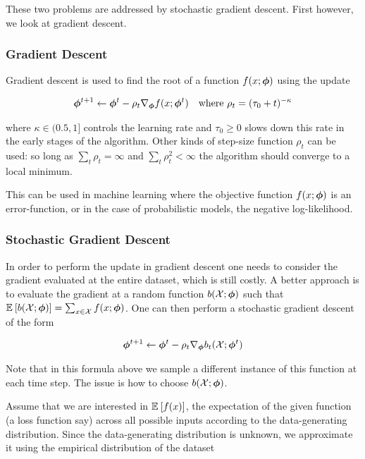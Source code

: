 These two problems are addressed by stochastic gradient descent. First however, we look at gradient descent.

\subsubsection*{Gradient Descent}
Gradient descent is used to find the root of a function $f(x; { \bm \phi })$ using the update

\begin{align*}
{  \bm \phi  }^{t+1} & \leftarrow {  \bm \phi  }^t - \rho_t \nabla_{ \bm \phi } f(x; { \bm \phi }^t) &
\text{where } \rho_t = (\tau_0 + t)^{-\kappa}
\end{align*}

where $\kappa \in (0.5,1]$ controls the learning rate and $\tau_0 \geq 0$ slows down this rate in the early stages of the algorithm. Other kinds of step-size function $\rho_t$ can be used: so long as $\sum_t \rho_t = \infty$ and $\sum_t \rho^2_t < \infty$ the algorithm should converge to a local minimum\cite{RobbinsMonro1951}. 

This can be used in machine learning where the objective function $f(x; { \bm \phi })$ is an error-function, or in the case of probabilistic models, the negative log-likelihood.

\subsubsection*{Stochastic Gradient Descent}
In order to perform the update in gradient descent one needs to consider the gradient evaluated at the entire dataset, which is still costly. A better approach is to evaluate the gradient at a random function $b({ \mathcal{X} }; { \bm \phi })$ such that $\mathbb{E}_{ {  } }\left[ b({ \mathcal{X} }; { \bm \phi }) \right] = \sum_{x \in { \mathcal{X} }} f(x; { \bm \phi })$. One can then perform a stochastic gradient descent of the form

\begin{align*}
{  \bm \phi  }^{t+1} \leftarrow {  \bm \phi  }^t - \rho_t \nabla_{ \bm \phi } b_t({ \mathcal{X} }; { \bm \phi }^t)
\end{align*}

Note that in this formula above we sample a different instance of this function at each time step. The issue is how to choose $b({ \mathcal{X} }; { \bm \phi })$.

Assume that we are interested in $\mathbb{E}_{ {  } }\left[ f(x) \right]$, the expectation of the given function (a loss function say) across all possible inputs according to the data-generating distribution. Since the data-generating distribution is unknown, we approximate it using the empirical distribution of the dataset

